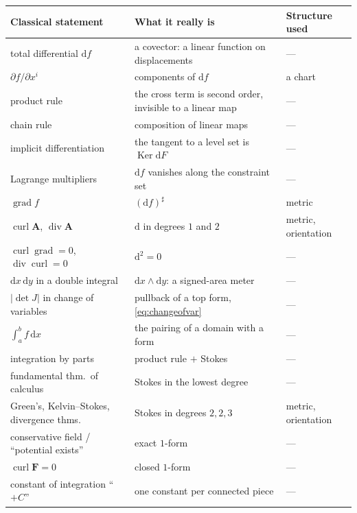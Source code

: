 \documentclass[10pt,a4paper]{article}
\newcommand{\dd}{\mathrm{d}}
\newcommand{\A}{\mathbf{A}}
\DeclareMathOperator{\grad}{grad}
\DeclareMathOperator{\curl}{curl}
\DeclareMathOperator{\dive}{div}
\newcommand{\Ker}{\operatorname{Ker}}
\theoremstyle{plain}
\theoremstyle{definition}
\numberwithin{equation}{section}
\begin{document}
\smallskip
{\footnotesize
\renewcommand{\arraystretch}{1.14}
\noindent\begin{tabular}{@{}L{0.345\textwidth}L{0.375\textwidth}L{0.215\textwidth}@{}}
\toprule
\textbf{Classical statement} & \textbf{What it really is} & \textbf{Structure used}\\
\midrule
total differential $\dd f$              & a covector: a linear function on displacements & --- \\
$\partial f/\partial x^i$               & components of $\dd f$             & a chart \\
product rule                            & the cross term is second order, invisible to a linear map & --- \\
chain rule                              & composition of linear maps        & --- \\
implicit differentiation                & the tangent to a level set is $\Ker\dd F$ & --- \\
Lagrange multipliers                    & $\dd f$ vanishes along the constraint set & --- \\
$\grad f$                               & $(\dd f)^\sharp$                  & metric \\
$\curl\A$, $\dive\A$                    & $\dd$ in degrees $1$ and $2$      & metric, orientation \\
$\curl\grad=0$, $\dive\curl=0$          & $\dd^2=0$                         & --- \\
$\dd x\,\dd y$ in a double integral     & $\dd x\wedge\dd y$: a signed-area meter & --- \\
$|\det J|$ in change of variables       & pullback of a top form, \eqref{eq:changeofvar} & --- \\
$\int_a^b f\,\dd x$                     & the pairing of a domain with a form & --- \\
integration by parts                    & product rule $+$ Stokes           & --- \\
fundamental thm.\ of calculus           & Stokes in the lowest degree       & --- \\
Green's, Kelvin--Stokes, divergence thms.\ & Stokes in degrees $2,2,3$      & metric, orientation \\
conservative field / ``potential exists'' & exact $1$-form                  & --- \\
$\curl\mathbf F=0$                      & closed $1$-form                   & --- \\
constant of integration ``$+C$''        & one constant per connected piece  & --- \\

\end{tabular}}
\end{document}
